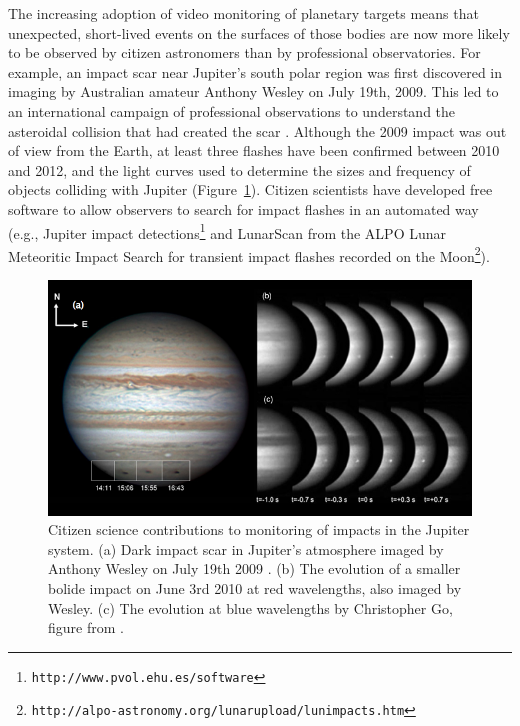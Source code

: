 \documentclass{ar2e}
\def\Fref#1{Figure~\ref{#1}\xspace}
\def\CaseStudy#1{\noindent{\it\bf #1 \,\,\,\,}}
\def\url#1{\texttt{#1}}
\begin{document}

\CaseStudy{Solar System Impacts.}
The increasing adoption of video monitoring of planetary targets means that
unexpected, short-lived events on the surfaces of those bodies  are now more
likely to be observed by citizen astronomers than by professional
observatories.  For example, an impact scar near Jupiter's south polar region
was first discovered in imaging by Australian amateur Anthony Wesley on July
19th, 2009. This led to an international campaign of professional observations
to understand the asteroidal collision that had created the scar
\citep[e.g.,][]{10hammel,10depater,11orton}.  Although the 2009 impact was out
of view from the Earth, at least three flashes have been confirmed between
2010 and 2012, and the light curves used to determine the sizes and frequency
of objects colliding with Jupiter \citep[e.g.,][]{13hueso}
(\Fref{fig:jupiter-impacts}).  Citizen scientists have developed free software
to allow observers to search for impact flashes in an automated way (e.g.,
Jupiter impact detections\footnote{\url{http://www.pvol.ehu.es/software}} and
LunarScan from the ALPO Lunar Meteoritic Impact Search for transient impact
flashes recorded on the
Moon\footnote{\url{http://alpo-astronomy.org/lunarupload/lunimpacts.htm}}).  

\begin{figure}[!ht]
\centering\includegraphics[width=\linewidth]{figs/jupiter-impacts.png}
\caption{Citizen science contributions to monitoring of impacts in the Jupiter
system. (a) Dark impact scar in Jupiter's atmosphere imaged by Anthony
Wesley on July 19th 2009 \citep{10sanchez}. (b) The
evolution of a smaller bolide impact on June 3rd 2010 at red
wavelengths, also imaged by Wesley. (c) The evolution at blue
wavelengths by Christopher Go, figure from \citet{10hueso}.}
\label{fig:jupiter-impacts}
\end{figure}
\end{document}
